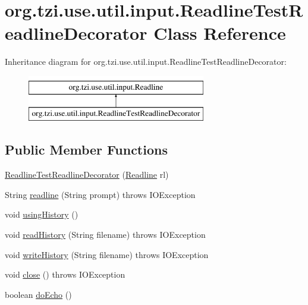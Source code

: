 \hypertarget{classorg_1_1tzi_1_1use_1_1util_1_1input_1_1_readline_test_readline_decorator}{\section{org.\-tzi.\-use.\-util.\-input.\-Readline\-Test\-Readline\-Decorator Class Reference}
\label{classorg_1_1tzi_1_1use_1_1util_1_1input_1_1_readline_test_readline_decorator}
}
Inheritance diagram for org.\-tzi.\-use.\-util.\-input.\-Readline\-Test\-Readline\-Decorator\-:\begin{figure}[H]
\begin{center}
\leavevmode
\includegraphics[height=2.000000cm]{classorg_1_1tzi_1_1use_1_1util_1_1input_1_1_readline_test_readline_decorator}
\end{center}
\end{figure}
\subsection*{Public Member Functions}
\begin{DoxyCompactItemize}
\item 
\hyperlink{classorg_1_1tzi_1_1use_1_1util_1_1input_1_1_readline_test_readline_decorator_a5f221cf7b6c66129b0eb1ae3823d4370}{Readline\-Test\-Readline\-Decorator} (\hyperlink{interfaceorg_1_1tzi_1_1use_1_1util_1_1input_1_1_readline}{Readline} rl)
\item 
String \hyperlink{classorg_1_1tzi_1_1use_1_1util_1_1input_1_1_readline_test_readline_decorator_a6985e48df0817866f0ef0444b36a0142}{readline} (String prompt)  throws I\-O\-Exception 
\item 
void \hyperlink{classorg_1_1tzi_1_1use_1_1util_1_1input_1_1_readline_test_readline_decorator_a56363e9867c1ce91f9b09d16765d1665}{using\-History} ()
\item 
void \hyperlink{classorg_1_1tzi_1_1use_1_1util_1_1input_1_1_readline_test_readline_decorator_a31755df0a9790a9a3d09feab607a829f}{read\-History} (String filename)  throws I\-O\-Exception 
\item 
void \hyperlink{classorg_1_1tzi_1_1use_1_1util_1_1input_1_1_readline_test_readline_decorator_a8918bafca65f4a9e132043827673c62d}{write\-History} (String filename)  throws I\-O\-Exception 
\item 
void \hyperlink{classorg_1_1tzi_1_1use_1_1util_1_1input_1_1_readline_test_readline_decorator_a1c87b13ff861570c56d50a84f73cfbce}{close} ()  throws I\-O\-Exception 
\item 
boolean \hyperlink{classorg_1_1tzi_1_1use_1_1util_1_1input_1_1_readline_test_readline_decorator_aa37552688a8b6a66f88c6f59367e1713}{do\-Echo} ()
\end{DoxyCompactItemize}
